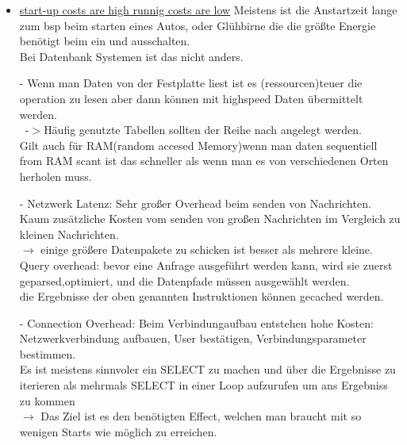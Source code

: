 \documentclass[12pt]{article}\pagestyle{myheadings}
\theoremstyle{plain}
\begin{document}
\begin{enumerate}
\begin{itemize}
\begin{center}
\end{center}
\item \underline{start-up costs are high runnig costs are low}
Meistens ist die Anstartzeit lange zum bsp beim starten eines Autos, oder Glühbirne die die größte Energie benötigt beim ein und ausschalten.\\
Bei Datenbank Systemen ist das nicht anders.\\
\item [-]Wenn man Daten von der Festplatte liest ist es (ressourcen)teuer die operation zu lesen aber dann können mit highspeed Daten übermittelt werden.\\\
-$>$Häufig genutzte Tabellen sollten der Reihe nach angelegt werden.\\
Gilt auch für RAM(random accesed Memory)wenn man daten sequentiell from RAM scant ist das schneller als wenn man es von verschiedenen Orten herholen muss.
\\
\item[-]Netzwerk Latenz: 
Sehr großer Overhead beim senden von Nachrichten.
Kaum zusätzliche Kosten vom senden von großen Nachrichten im Vergleich zu kleinen Nachrichten.\\
$\rightarrow$ einige größere Datenpakete zu schicken ist besser als mehrere kleine.\\
Query overhead: bevor eine Anfrage ausgeführt werden kann, wird sie zuerst geparsed,optimiert, und die Datenpfade müssen ausgewählt werden. \\
die Ergebnisse der oben genannten Instruktionen können gecached werden.\\
\item[-]Connection Overhead: Beim Verbindungaufbau entstehen hohe Kosten: Netzwerkverbindung aufbauen, User bestätigen, Verbindungsparameter bestimmen.\\
Es ist meistens sinnvoler ein SELECT zu machen und über die Ergebnisse zu iterieren als mehrmals SELECT in einer Loop aufzurufen um ans Ergebniss zu kommen\\
$\rightarrow$ Das Ziel ist es den benötigten Effect, welchen man braucht mit so wenigen Starts wie möglich zu erreichen.


\end{itemize}
\end{enumerate}
\end{document}
